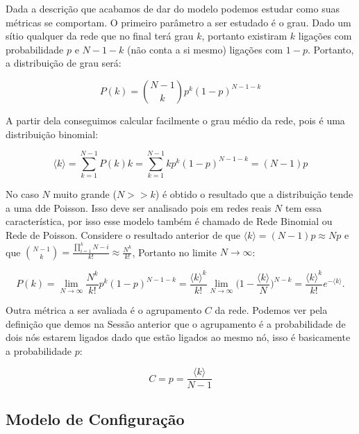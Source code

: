 Dada a descrição que acabamos de dar do modelo podemos estudar como suas métricas se comportam. O primeiro parâmetro a ser estudado é o grau. Dado um sítio qualquer da rede que no final terá grau $k$, portanto existiram $k$ ligações com probabilidade $p$ e $N - 1 - k$ (não conta a si mesmo) ligações com $1 - p$. Portanto, a distribuição de grau será:

\begin{equation}
  P(k) = {N - 1 \choose k}p^k(1-p)^{N - 1 - k}
\end{equation}

A partir dela conseguimos calcular facilmente o grau médio da rede, pois é uma distribuição binomial:

\begin{equation}
  \langle k \rangle = \sum_{k = 1}^{N - 1}P(k)k = \sum_{k = 1}^{N - 1}kp^k(1-p)^{N - 1 - k} = (N - 1)p
\end{equation}

No caso $N$ muito grande ($N >> k$) é obtido o resultado que a distribuição tende a uma dde Poisson. Isso deve ser analisado pois em redes reais $N$ tem essa característica, por isso esse modelo também é chamado de Rede Binomial ou Rede de Poisson. Considere o resultado anterior de que $\langle k \rangle = (N -1)p \approx Np$ e que ${N - 1 \choose k} = \frac{\prod\limits_{i = 1}^{k} N - i}{k!} \approx \frac{N^k}{k!}$, Portanto no limite $N \rightarrow \infty$:

\begin{equation}
  P(k) = \lim\limits_{N \rightarrow \infty} \frac{N^k}{k!}p^k(1 - p)^{N - 1 - k} = \frac{\langle k \rangle^k}{k!}\lim\limits_{N \rightarrow \infty}\Bigg(1 - \frac{\langle k \rangle}{N}\Bigg)^{N - k} = \frac{\langle k \rangle^k}{k!}e^{-\langle k \rangle}.
\end{equation}

Outra métrica a ser avaliada é o agrupamento $C$ da rede. Podemos ver pela definição que demos na Sessão anterior que o agrupamento é a probabilidade de dois nós estarem ligados dado que estão ligados ao mesmo nó, isso é basicamente a probabilidade $p$:

\begin{equation}
  C = p = \frac{\langle k \rangle}{N - 1}
\end{equation}

\subsection{Modelo de Configuração}


